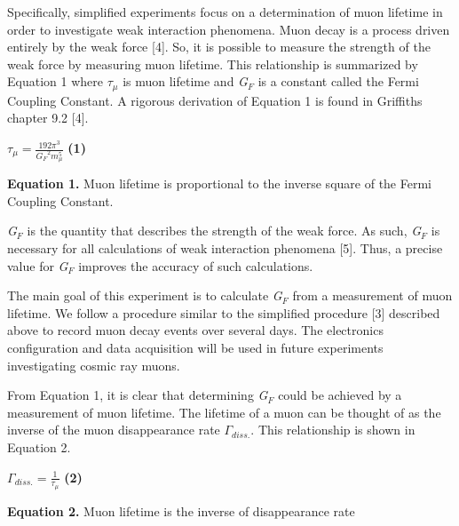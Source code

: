 \documentclass{article}
\begin{document}


Specifically, simplified experiments focus on a determination of muon lifetime in order to investigate weak interaction phenomena. Muon decay is a process driven entirely by the weak force [4]. %
So, it is possible to measure the strength of the weak force by measuring muon lifetime. This relationship is summarized by Equation 1 where $\tau_{\mu}$ is muon lifetime and \textit{G$_{F}$} is a constant called the Fermi Coupling Constant. A rigorous derivation of Equation 1 is found in Griffiths chapter 9.2 [4]. %

\begin{center}

    $\tau_{\mu} = \frac{192 \pi^3}{\textit{G$_{F}$}^2 m_{\mu}^5}$ \hspace{10mm} \textbf{(1)}

    \vspace{5mm}

    \textbf{Equation 1.} Muon lifetime is proportional to the inverse square of the Fermi Coupling Constant.

\end{center}


\textit{G$_{F}$} is the quantity that describes the strength of the weak force. As such, \textit{G$_{F}$} is necessary for all calculations of weak interaction phenomena [5]. %
Thus, a precise value for \textit{G$_{F}$} improves the accuracy of such calculations.

The main goal of this experiment is to calculate \textit{G$_{F}$} from a measurement of muon lifetime. We follow a procedure similar to the simplified procedure [3] %
described above to record muon decay events over several days. The electronics configuration and data acquisition will be used in future experiments investigating cosmic ray muons.

From Equation 1, it is clear that determining \textit{G$_{F}$} could be achieved by a measurement of muon lifetime. The lifetime of a muon can be thought of as the inverse of the muon disappearance rate $\Gamma_{diss.}$. This relationship is shown in Equation 2.

\begin{center}

    $\Gamma_{diss.} = \frac{1}{\tau_{\mu}}$ \hspace{10mm} \textbf{(2)}

    \vspace{5mm}

    \textbf{Equation 2.} Muon lifetime is the inverse of disappearance rate

\end{center}
\end{document}
